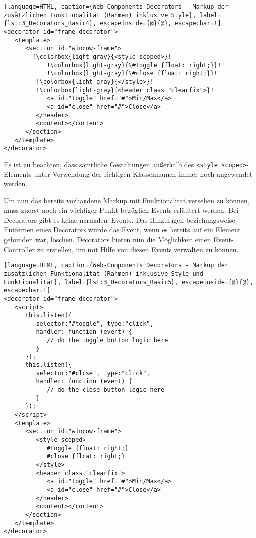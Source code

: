 \begin{lstlisting}[language=HTML, caption={Web-Components Decorators - Markup der zusätzlichen Funktionalität (Rahmen) inklusive Style}, label={lst:3_Decorators_Basic4}, escapeinside={@}{@}, escapechar=!]
<decorator id="frame-decorator">
   <template>
      <section id="window-frame">
        !\colorbox{light-gray}{<style scoped>}!
            !\colorbox{light-gray}{\#toggle {float: right;}}!
            !\colorbox{light-gray}{\#close {float: right;}}!
         !\colorbox{light-gray}{</style>}!
         !\colorbox{light-gray}{<header class="clearfix">}!
            <a id="toggle" href="#">Min/Max</a>
            <a id="close" href="#">Close</a>
         </header>
         <content></content>
      </section>
   </template>
</decorator>
\end{lstlisting}

Es ist zu beachten, dass sämtliche Gestaltungen außerhalb des \lstinline|<style scoped>|-Elements unter Verwendung der richtigen Klassennamen immer noch angewendet werden.

Um nun das bereits vorhandene Markup mit Funktionalität versehen zu können, muss zuerst noch ein wichtiger Punkt bezüglich Events erläutert werden. Bei Decorators gibt es keine \glqq normalen\grqq\ Events. Das Hinzufügen beziehungsweise Entfernen eines Decorators würde das Event, wenn es bereits auf ein Element gebunden war, löschen. Decorators bieten nun die Möglichkeit einen Event-Controller zu erstellen, um mit Hilfe von diesen Events verwalten zu können.

\begin{lstlisting}[language=HTML, caption={Web-Components Decorators - Markup der zusätzlichen Funktionalität (Rahmen) inklusive Style und Funktionalität}, label={lst:3_Decorators_Basic5}, escapeinside={@}{@}, escapechar=!]
<decorator id="frame-decorator">
   <script>
      this.listen({
         selector:"#toggle", type:"click",
         handler: function (event) {
            // do the toggle button logic here
         }
      });
      this.listen({
         selector:"#close", type:"click",
         handler: function (event) {
            // do the close button logic here
         }
      });
   </script>
   <template>
      <section id="window-frame">
         <style scoped>
            #toggle {float: right;}
            #close {float: right;}
         </style>
         <header class="clearfix">
            <a id="toggle" href="#">Min/Max</a>
            <a id="close" href="#">Close</a>
         </header>
         <content></content>
      </section>
   </template>
</decorator>
\end{lstlisting}


